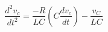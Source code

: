 \documentclass[preview]{standalone}
\begin{document}
\begin{center}
\[\frac{d^2v_c}{dt^2} = \frac{-R}{LC} \left(C \frac{dv_c}{dt} \right) - \frac{v_C}{LC}\]
\end{center}
\end{document}
